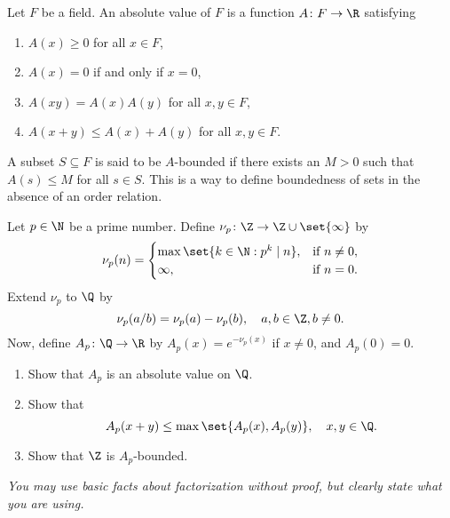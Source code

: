 \documentclass[12pt]{article}
\begin{document}
\begin{problem*}
    Let $F$ be a field.
    An absolute value of $F$ is a function $A \colon F \to \R$ satisfying
    \begin{enumerate}[label=(\arabic*)]
        \item $A(x) \ge 0$ for all $x \in F$,
        \item $A(x) = 0$ if and only if $x = 0$,
        \item $A(xy) = A(x)A(y)$ for all $x, y \in F$,
        \item $A(x + y) \le A(x) + A(y)$ for all $x, y \in F$.
    \end{enumerate}
    A subset $S \subseteq F$ is said to be $A$-bounded if there exists an
    $M > 0$ such that $A(s) \le M$ for all $s \in S$.
    This is a way to define boundedness of sets
    in the absence of an order relation.

    Let $p \in \N$ be a prime number.
    Define $\nu_p \colon \Z \to \Z \cup \set{\infty}$ by \[
        \nu_p(n) = \begin{cases}
            \max\set{k \in \N : p^k \mid n}, & \text{if } n \ne 0, \\
            \infty, & \text{if } n = 0.
        \end{cases}
    \] Extend $\nu_p$ to $\Q$ by \[
        \nu_p(a/b) = \nu_p(a) - \nu_p(b), \quad a, b \in \Z, b \ne 0.
    \] Now, define $A_p \colon \Q \to \R$ by $A_p(x) = e^{-\nu_p(x)}$ if
    $x \ne 0$, and $A_p(0) = 0$.
    \begin{enumerate}[label=(\alph*)]
        \item Show that $A_p$ is an absolute value on $\Q$.
        \item Show that \[
            A_p(x + y) \le \max\set{A_p(x), A_p(y)}, \quad x, y \in \Q.
        \]
        \item Show that $\Z$ is $A_p$-bounded.
    \end{enumerate}
    \textit{You may use basic facts about factorization without proof,
    but clearly state what you are using.}
\end{problem*}
\end{document}
